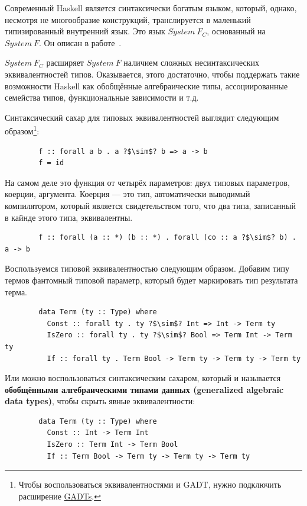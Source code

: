 \documentclass[12pt]{article}
\newcommand{\vocab}[1]{\textbf{#1}} %
\begin{document}
    Современный Haskell является синтаксически богатым языком, который, однако, несмотря не многообразие конструкций, транслируется в маленький типизированный внутренний язык.
    Это язык $System~F_C$, основанный на $System~F$.
    Он описан в работе~\cite{sulzmann2007system}.

    $System~F_C$ расширяет $System~F$ наличием сложных несинтаксических эквивалентностей типов.
    Оказывается, этого достаточно, чтобы поддержать такие возможности Haskell как обобщённые алгебраические типы, ассоциированные семейства типов, функциональные зависимости и т.д.

    Синтаксический сахар для типовых эквивалентностей выглядит следующим образом\footnote{Чтобы воспользоваться эквивалентностями и GADT, нужно подключить расширение \href{https://downloads.haskell.org/~ghc/9.0.1/docs/html/users_guide/exts/gadt.html}{GADTs}.}:
    \begin{verbatim}
        f :: forall a b . a ?$\sim$? b => a -> b
        f = id
    \end{verbatim}
    На самом деле это функция от четырёх параметров: двух типовых параметров, коерции, аргумента.
    Коерция --- это тип, автоматически выводимый компилятором, который является свидетельством того, что два типа, записанный в кайнде этого типа, эквивалентны.
    \begin{verbatim}
        f :: forall (a :: *) (b :: *) . forall (co :: a ?$\sim$? b) . a -> b
    \end{verbatim}

    Воспользуемся типовой эквивалентностью следующим образом.
    Добавим типу термов фантомный типовой параметр, который будет маркировать тип результата терма.
    \begin{verbatim}
        data Term (ty :: Type) where
          Const :: forall ty . ty ?$\sim$? Int => Int -> Term ty
          IsZero :: forall ty . ty ?$\sim$? Bool => Term Int -> Term ty
          If :: forall ty . Term Bool -> Term ty -> Term ty -> Term ty
    \end{verbatim}
    Или можно воспользоваться синтаксическим сахаром, который и называется \vocab{обобщёнными алгебраическими типами данных (generalized algebraic data types)}, чтобы скрыть явные эквивалентности:
    \begin{verbatim}
        data Term (ty :: Type) where
          Const :: Int -> Term Int
          IsZero :: Term Int -> Term Bool
          If :: Term Bool -> Term ty -> Term ty -> Term ty
    \end{verbatim}
\end{document}
